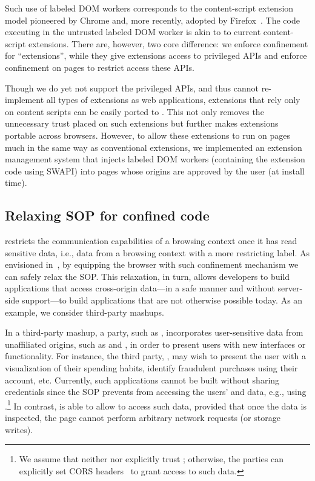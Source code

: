 Such use of labeled DOM workers corresponds to the content-script extension
model pioneered by Chrome and, more recently, adopted by
Firefox~\cite{Carlini:2012}.
%
The code executing in the untrusted labeled DOM worker is akin to
to current content-script extensions.
%
There are, however, two core difference: we enforce confinement for
``extensions'', while they give extensions access to privileged APIs
and enforce confinement on pages to restrict access these APIs.

Though we do yet not support the privileged APIs, and thus cannot re-implement
all types of extensions as web applications, extensions that rely only on
content scripts can be easily ported to \sys{}.
%
This not only removes the unnecessary trust placed on such extensions but further
makes extensions portable across browsers.
% 
However, to allow these extensions to run on pages much in the same
way as conventional extensions, we implemented an extension management
system that injects labeled DOM workers (containing the extension code
using SWAPI) into pages whose origins are approved by the user (at
install time).
%

\subsection{Relaxing SOP for confined code}
\label{sec:system:mashup}
%
\sys{} restricts the communication capabilities of a browsing context
once it has read sensitive data, i.e., data from a browsing context
with a more restricting label.
%
As envisioned in~\cite{yang:2013:towards}, by equipping the browser with such
confinement mechanism we can safely relax the SOP.
%
This relaxation, in turn, allows developers to build applications that access
cross-origin data---in a safe manner and without server-side support---to build
applications that are not otherwise possible today.
%
As an example, we consider third-party mashups.

In a third-party mashup, a party, such as ,
incorporates user-sensitive data from unaffiliated origins, such as
 and , in order to present users with new
interfaces or functionality.
%
For instance, the third party, , may wish to present the user with a
visualization of their spending habits, identify fraudulent
 purchases using their  account, etc.
%
Currently, such applications cannot be built without sharing
credentials since the SOP prevents
 from accessing the users'  and
 data, e.g., using \xhr{}.\footnote{
 We assume that neither  nor 
 explicitly trust ; otherwise, the parties can
 explicitly set CORS headers~\cite{cors13} to grant 
 access to such data.
}
%
In contrast, \sys{} is able to allow  to access such
data, provided that once the data is inspected, the page cannot
perform arbitrary network requests (or storage writes).
 
